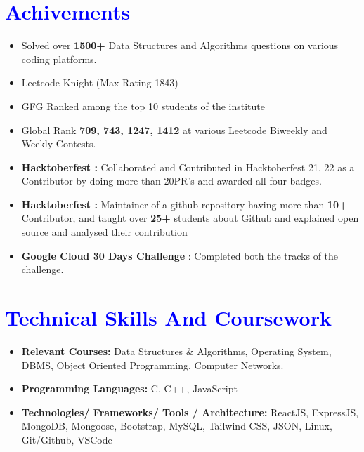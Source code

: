 \documentclass[letterpaper,11pt]{article}
\newcommand{\resumeSubHeadingListStart}{\begin{itemize}[leftmargin=*]}
\newcommand{\resumeSubHeadingListEnd}{\end{itemize}}
\begin{document}
\section{\textbf{\textcolor{blue}{Achivements}}}
  \resumeSubHeadingListStart
  \begin{itemize}
  \item Solved over \textbf{1500+} Data Structures and Algorithms questions on various coding platforms.
  \item Leetcode \href{https://leetcode.com/Subrat_Yeeshu/}{\faExternalLink} Knight (Max Rating 1843)
  \item GFG \href{https://auth.geeksforgeeks.org/user/subrat_yeeshu/}{\faExternalLink} Ranked among the top 10 students of the institute
  \item Global Rank \textbf{709, 743, 1247, 1412} at various Leetcode Biweekly and Weekly Contests.
  \item \textbf{Hacktoberfest : }Collaborated and Contributed in Hacktoberfest 21, 22 as a Contributor by doing more than 20PR's and awarded all four badges.
  \item \textbf{Hacktoberfest : }Maintainer of a github repository having more than \textbf{10+} Contributor, and taught over \textbf{25+} students about Github and explained open source and analysed their contribution
        
  \item \textbf{Google Cloud 30 Days Challenge} : Completed both the tracks of the challenge.
\end{itemize}
      
 
     
 \resumeSubHeadingListEnd

\section{\textbf{\textcolor{blue}{Technical Skills And Coursework}}}
\resumeSubHeadingListStart
\begin{itemize}
     \item \textbf{Relevant Courses:} {Data Structures \& Algorithms, Operating System, DBMS, Object Oriented Programming, Computer Networks.}
    \item \textbf{Programming Languages:} {C, C++, JavaScript}
    \item\textbf{Technologies/ Frameworks/ Tools / Architecture:} {ReactJS, ExpressJS, MongoDB, Mongoose, Bootstrap, MySQL, Tailwind-CSS, JSON, Linux, Git/Github, VSCode}
      \end{itemize}
    \resumeSubHeadingListEnd
    
\end{document}
